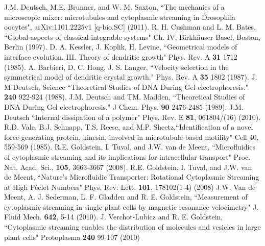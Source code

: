 \documentclass[pre,showpacs]{revtex4}
\begin{document}
\begin{thebibliography}{}
 J.M. Deutsch, M.E. Brunner, and W. M. Saxton,
``The mechanics of a microscopic mixer: microtubules and cytoplasmic streaming in Drosophila oocytes", arXiv:1101.2225v1 [q-bio.SC] (2011).
 R. H. Cushman and L. M. Bates, ``Global aspects of classical integrable systems" Ch. IV, Birkh\"auser Basel, Boston, Berlin (1997).
 D. A. Kessler, J. Koplik, H. Levine, ``Geometrical models of interface evolution. III. Theory of dendritic growth"  Phys. Rev. A {\bf 31}  1712 (1985).
 A. Barbieri, D. C. Hong, J. S. Langer, ``Velocity selection in the symmetrical model of dendritic crystal growth." 
Phys. Rev. A {\bf 35} 1802 (1987).
 J. M Deutsch, Science ``Theoretical Studies of DNA During Gel electrophoresis." {\bf 240} 922-924 (1988).   
  J.M. Deutsch and TM. Madden,  ``Theoretical Studies of DNA During Gel electrophoresis." J Chem. Phys. {\bf 90} 2476-2485 (1989).
 J.M. Deutsch ``Internal dissipation of a polymer" Phys. Rev. E {\bf 81}, 061804/(16) (2010).
 R.D. Vale, B.J.  Schnapp, T.S. Reese, and M.P.  Sheetz,``Identification of a novel force-generating protein, kinesin, involved in microtubule-based motility"   Cell 40, 559-569 (1985).
 R.E. Goldstein, I. Tuval, and J.W. van de Meent, ``Microfluidics of cytoplasmic streaming and its
implications for intracellular transport" Proc. Nat. Acad. Sci.,  {\bf 105}, 3663-3667 (2008).
 R.E. Goldstein, I. Tuval, and J.W. van de Meent, 
``Nature’s Microfluidic Transporter: Rotational Cytoplasmic Streaming at High P{\'e}clet Numbers"
Phys. Rev. Lett. {\bf 101}, 178102(1-4) (2008)
 J.W. Van de Meent, A. J. Sederman, L. F. Gladden and R. E. Goldstein,
``Measurement of cytoplasmic streaming in single plant cells by magnetic resonance velocimetry"
J. Fluid Mech. {\bf 642},  5-14 (2010).
J. Verchot-Lubicz  and R. E. Goldstein, ``Cytoplasmic streaming enables the distribution of molecules
and vesicles in large plant cells" Protoplasma {\bf 240} 99-107 (2010) 

\end{thebibliography}
\end{document}
